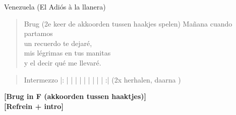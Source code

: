 \begin{song}[joropo]{Venezuela (El Adiós à la llanera)}
\begin{verse}{Brug (2e keer de akkoorden tussen haakjes spelen)}
Ma\~{n}ana cuando partamos\\
un recuerdo te dejar\'{e},\hspace{2em}\hspace{5em}\\
mis l\'{e}grimas en tus manitas\\
y el decir qu\'{e} me llevar\'{e}.\\
\end{verse}
\begin{verse}{Intermezzo}
|:  |  \hspace{2em} | \hspace{3.9em} |  \hspace{2em} | \hspace{4em} |  \hspace{2em} |  \hspace{3em} |  \hspace{2em} | \hspace{0.3em} \hspace{2em} |  \hspace{2.55em} :| (2x herhalen, daarna )\\

\end{verse}

\textbf{[Brug in F (akkoorden tussen haaktjes)]}\\
\textbf{[Refrein + intro]}\\
\vspace{10em}
\end{song}
